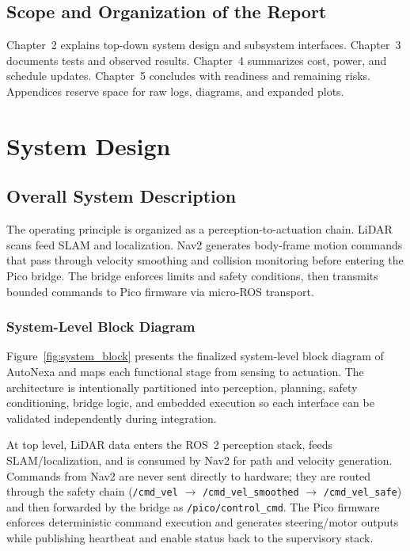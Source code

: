 \documentclass[12pt,a4paper]{report}
\begin{document}
\section{Scope and Organization of the Report}
Chapter~2 explains top-down system design and subsystem interfaces. Chapter~3 documents tests and observed results. Chapter~4 summarizes cost, power, and schedule updates. Chapter~5 concludes with readiness and remaining risks. Appendices reserve space for raw logs, diagrams, and expanded plots.

\chapter{System Design}

\section{Overall System Description}
The operating principle is organized as a perception-to-actuation chain. LiDAR scans feed SLAM and localization. Nav2 generates body-frame motion commands that pass through velocity smoothing and collision monitoring before entering the Pico bridge. The bridge enforces limits and safety conditions, then transmits bounded commands to Pico firmware via micro-ROS transport.

\subsection{System-Level Block Diagram}
Figure~\ref{fig:system_block} presents the finalized system-level block diagram of AutoNexa and maps each functional stage from sensing to actuation. The architecture is intentionally partitioned into perception, planning, safety conditioning, bridge logic, and embedded execution so each interface can be validated independently during integration.

At top level, LiDAR data enters the ROS~2 perception stack, feeds SLAM/localization, and is consumed by Nav2 for path and velocity generation. Commands from Nav2 are never sent directly to hardware; they are routed through the safety chain (\texttt{/cmd\_vel} $\rightarrow$ \texttt{/cmd\_vel\_smoothed} $\rightarrow$ \texttt{/cmd\_vel\_safe}) and then forwarded by the bridge as \texttt{/pico/control\_cmd}. The Pico firmware enforces deterministic command execution and generates steering/motor outputs while publishing heartbeat and enable status back to the supervisory stack.
\end{document}
